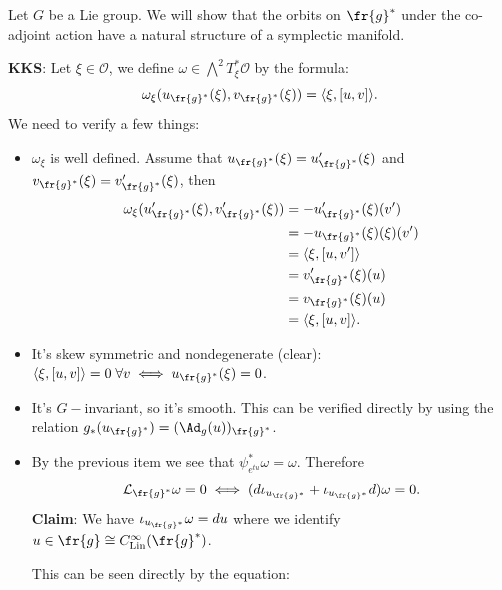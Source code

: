     Let $G$ be a Lie group. We will show that the orbits on $\fr{g}^*$ under the co-adjoint action have a natural
    structure of a symplectic manifold.\par
    \textbf{KKS}: Let $\xi\in\mathcal{O}$, we define $\omega\in\bigwedge^2T_\xi^*\mathcal{O}$ by the formula: 
    \begin{equation}
        \omega_\xi(u_{\fr{g}^*}(\xi),v_{\fr{g}^*}(\xi))=\langle\xi,[u,v] \rangle.
    \end{equation}
    We need to verify a few things:
\begin{itemize}
    \item $\omega_\xi$ is well defined. Assume that $u_{\fr{g}^*}(\xi)=u_{\fr{g}^*}^\prime(\xi)$ and 
    $v_{\fr{g}^*}(\xi)=v_{\fr{g}^*}^\prime(\xi)$, then 
    \begin{equation}
        \begin{split}
            \omega_\xi(u_{\fr{g}^*}^\prime(\xi),v_{\fr{g}^*}^\prime(\xi))&=
            -u_{\fr{g}^*}^\prime(\xi)(v^\prime)\\
            &=-u_{\fr{g}^*}(\xi)(\xi)(v^\prime)\\
            &=\langle \xi,[u,v^\prime] \rangle\\
            &=v_{\fr{g}^*}^\prime(\xi)(u)\\
            &=v_{\fr{g}^*}(\xi)(u)\\
            &=\langle\xi,[u,v] \rangle.
        \end{split}
    \end{equation}
    \item It's skew symmetric and nondegenerate (clear): $\langle\xi,[u,v] \rangle=0\;\forall v\iff u_{\fr{g}^*}(\xi)=0$.
    \item It's $G-$invariant, so it's smooth. This can be verified directly by using the relation $g_*(u_{\fr{g}^*})=(\Ad_g(u))_{\fr{g}^*}$.
    \item By the previous item we see that $\psi_{e^{tu}}^*\omega=\omega$. Therefore 
    \begin{equation}
        \mathcal{L}_{\fr{g}^*}\omega=0\iff (d\iota_{u_{\fr{g}^*}}+\iota_{u_{\fr{g}^*}}d)\omega=0.
    \end{equation}
    \textbf{Claim}: We have $\iota_{u_{\fr{g}^*}}\omega=du$ where we identify $u\in\fr{g}\cong C^\infty_{\text{Lin}}(\fr{g}^*)$.\par 
    This can be seen directly by the equation:
    \begin{equation}
        \begin{split}

\end{split}
\end{equation}
\end{itemize}
